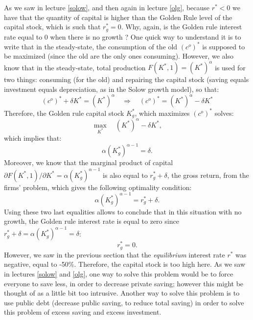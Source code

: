 \documentclass[]{book}
\theoremstyle{definition}
\theoremstyle{definition}
\theoremstyle{definition}
\theoremstyle{remark}
\begin{document}
As we saw in lecture \ref{solow}, and then again in lecture \ref{olg},
because \(r^{*}<0\) we have that the quantity of capital is higher than
the Golden Rule level of the capital stock, which is such that
\(r^{*}_g=0\). Why, again, is the Golden rule interest rate equal to 0
when there is no growth ? One quick way to understand it is to write
that in the steady-state, the consumption of the old \((c^{o})^{*}\) is
supposed to be maximized (since the old are the only ones consuming).
However, we also know that in the steady-state, total production
\(F(K^{*}, 1) = (K^{*})^{\alpha}\) is used for two things: consuming
(for the old) and repairing the capital stock (saving equals investment
equals depreciation, as in the Solow growth model), so that:
\[(c^{o})^{*} + \delta K^{*} = (K^{*})^{\alpha} \quad \Rightarrow \quad (c^{o})^{*} = (K^{*})^{\alpha} -\delta K^{*} \]
Therefore, the Golden rule capital stock \(K^{*}_g\), which maximizes
\((c^{o})^{*}\) solves:
\[\max_{K^{*}}\quad (K^{*})^{\alpha}-\delta K^{*},\] which implies that:
\[\alpha (K^{*}_g)^{\alpha-1}=\delta.\] Moreover, we know that the
marginal product of capital
\(\partial F(K^{*}, 1)/\partial K^{*} = \alpha (K^{*}_g)^{\alpha-1}\) is
also equal to \(r^{*}_g+\delta\), the gross return, from the firms'
problem, which gives the following optimality condition:
\[\alpha (K^{*}_g)^{\alpha-1}=r^{*}_g+\delta.\] Using these two last
equalities allows to conclude that in this situation with no growth, the
Golden rule interest rate is equal to zero since
\(r^{*}_g+\delta = \alpha (K^{*}_g)^{\alpha-1} =\delta\): \[r^{*}_g=0.\]
However, we saw in the previous section that the \emph{equilibrium}
interest rate \(r^{*}\) was negative, equal to -50\%. Therefore, the
capital stock is too high here. As we saw in lectures \ref{solow} and
\ref{olg}, one way to solve this problem would be to force everyone to
save less, in order to decrease private saving; however this might be
thought of as a little bit too intrusive. Another way to solve this
problem is to use public debt (decrease public saving, to reduce total
saving) in order to solve this problem of excess saving and excess
investment.
\end{document}
